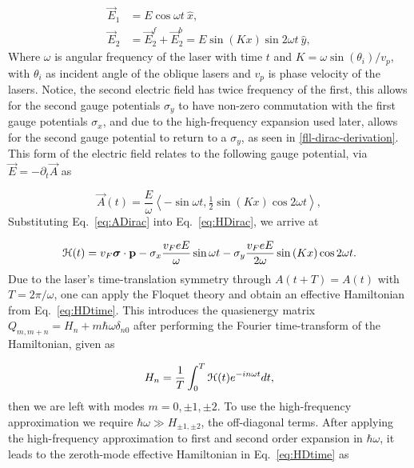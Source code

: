\begin{align} \label{eq:EDfield}
\vec{E}_{1} &= E\cos \omega t\ \hat{x}, \nonumber \\
\vec{E}_{2} &= \vec{E}_2^f + \vec{E}_2^b = E\sin(Kx)\sin 2\omega t\ \hat{y},
\end{align}
Where $\omega$ is angular frequency of the laser with time $t$ and $K = \omega \sin{(\theta_i)} / v_p$, with $\theta_i$ as incident angle of the oblique lasers and $v_p$ is phase velocity of the lasers.
Notice, the second electric field has twice frequency of the first, this allows for the second gauge potentials $\sigma_y$ to have non-zero commutation with the first gauge potentials $\sigma_x$, and due to the high-frequency expansion used later, allows for the second gauge potential to return to a $\sigma_y$, as seen in \ref{fll-dirac-derivation}.
This form of the electric field relates to the following gauge potential, via $\vec{E} = -\partial_t \vec{A}$ as

\begin{equation}\label{eq:ADirac}
  \vec{A}(t)= \dfrac{E}{\omega} \left\langle -\sin \omega t, \tfrac{1}{2}\sin(Kx) \cos 2\omega t \right\rangle,
\end{equation}%
Substituting Eq.~\eqref{eq:ADirac} into Eq.~\eqref{eq:HDirac}, we arrive at%

\begin{equation}\label{eq:HDtime}
  \mathcal{H}(t)= v_{F}\bm{\sigma}\cdot\mathbf{p} - \sigma _{x} \dfrac{v_F eE}{\omega} \sin {\omega t} - \sigma _{y} \dfrac{v_F eE}{2\omega}\sin{(Kx)} \cos2\omega t.
\end{equation}%
Due to the laser's time-translation symmetry through $A(t+T)=A(t)$ with $T=2\pi /\omega $, one can apply the Floquet theory \cite{AEE, MBL, supp} and obtain an effective Hamiltonian from Eq.~\eqref{eq:HDtime}.
This introduces the quasienergy matrix $Q_{m,m+n} = H_n + m\hbar\omega\delta_{n0}$ after performing the Fourier time-transform of the Hamiltonian, given as

\begin{equation} \label{eq:fourier-time-transform}
  H_n = \dfrac{1}{T} \int_{0}^{T} \mathcal{H}(t) e^{-in\omega t} dt,
\end{equation}
then we are left with modes $m=0,\pm1,\pm2$.
To use the high-frequency approximation we require $\hbar\omega \gg H_{\pm1,\pm2}$, the off-diagonal terms.
After applying the high-frequency approximation to first and second order expansion in $\hbar\omega$, it leads to the zeroth-mode effective Hamiltonian in Eq.~\eqref{eq:HDtime} as

